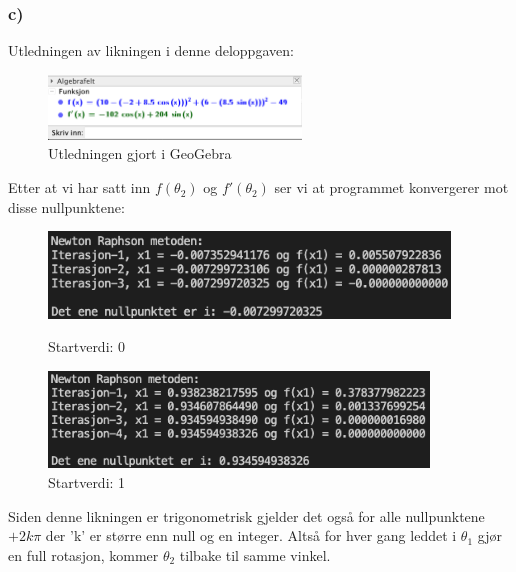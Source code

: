 \subsubsection{c)}
Utledningen av likningen i denne deloppgaven:

\begin{figure}[h!]
    \centering
    \includegraphics[width = 0.6\textwidth]{Figures/del2_2c_utledning.png}
    \caption{Utledningen gjort i GeoGebra}
    \label{fig:my_label}
\end{figure}

Etter at vi har satt inn $f(\theta_2)$ og $f'(\theta_2)$ ser vi at programmet konvergerer mot disse nullpunktene:

\begin{figure}[h!]
    \centering
    \begin{minipage}{0.45\textwidth}
        \centering
        \includegraphics[width=0.95\textwidth]{Figures/del2_2c_1.png}
        \caption{Startverdi: 0}
    \end{minipage}\hfill
    \begin{minipage}{0.45\textwidth}
        \centering
        \includegraphics[width=0.9\textwidth]{Figures/del2_2c_2.png}
        \caption{Startverdi: 1}
    \end{minipage}
\end{figure}

Siden denne likningen er trigonometrisk gjelder det også for alle nullpunktene $+2k\pi$ der 'k' er større enn null og en integer. Altså for hver gang leddet i $\theta_1$ gjør en full rotasjon, kommer $\theta_2$ tilbake til samme vinkel. %
 